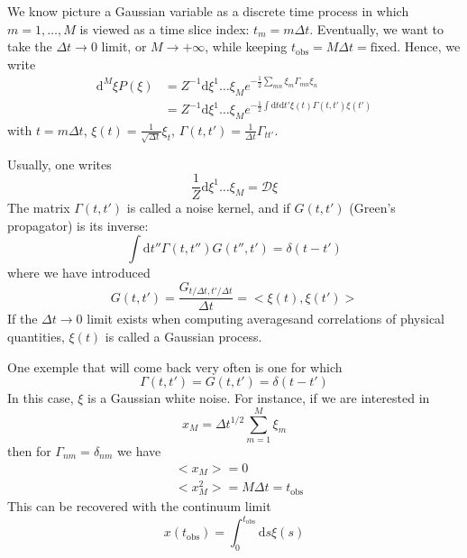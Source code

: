\documentclass[a4paper]{book}
\theoremstyle{definition}
\theoremstyle{remark}
\begin{document}
We know picture a Gaussian variable as a discrete time process in which $m=1,\dots, M$ is viewed as a time slice index: $t_m = m\Delta t$. Eventually, we want to take the $\Delta t \rightarrow 0$ limit, or $M \rightarrow +\infty$, while keeping $t_\text{obs} = M\Delta t = \text{fixed}$. Hence, we write 
\begin{equation}
    \begin{aligned}
        \text{d}^M\xi P(\xi) &= Z^{-1} \text{d}\xi^1\dots \xi_M e^{-\frac{1}{2} \sum_{mn} \xi_m \Gamma_{mn}\xi_n} \\
        &=  Z^{-1} \text{d}\xi^1\dots \xi_M e^{-\frac{1}{2}\int \text{d}t\text{d}t' \xi(t)\Gamma(t, t')\xi(t')}
    \end{aligned}
\end{equation} 
with $t = m\Delta t$, $\xi(t) = \frac{1}{\sqrt{\Delta t}}\xi_t$, $\Gamma(t, t') = \frac{1}{\Delta t}\Gamma_{tt'}$. \par \medskip 

Usually, one writes 
\begin{equation}
    \frac{1}{Z}\text{d}\xi^1\dots \xi_M = \mathcal{D}\xi
\end{equation}
The matrix $\Gamma(t, t')$ is called a noise kernel, and if $G(t, t')$ (Green's propagator) is its inverse:
\begin{equation}
    \int \text{d}t'' \Gamma(t, t'')G(t'', t') = \delta (t-t')
\end{equation}
where we have introduced 
\begin{equation}
    G(t, t') = \frac{G_{t/\Delta t, t'/\Delta t}}{\Delta t} = <\xi(t), \xi(t')>
\end{equation}
If the $\Delta t \rightarrow 0$ limit exists when computing averagesand correlations of physical quantities, $\xi(t)$ is called a Gaussian process. \par \medskip 

One exemple that will come back very often is one for which 
\begin{equation}
    \Gamma(t, t') = G(t, t') = \delta(t-t')
\end{equation}
In this case, $\xi$ is a Gaussian white noise. For instance, if we are interested in 
\begin{equation}
    x_M = \Delta t^{1/2} \sum_{m=1}^M \xi_m 
\end{equation}
then for $\Gamma_{nm} = \delta_{nm}$ we have 
\begin{equation}
    \begin{aligned}
        &<x_M> = 0 \\
        &<x^2_M> = M\Delta t = t_{\text{obs}}
    \end{aligned}
\end{equation}
This can be recovered with the continuum limit 
\begin{equation}
    x(t_{\text{obs}}) = \int_{0}^{t_{\text{obs}}}\text{d}s \xi(s)
\end{equation}
\end{document}
